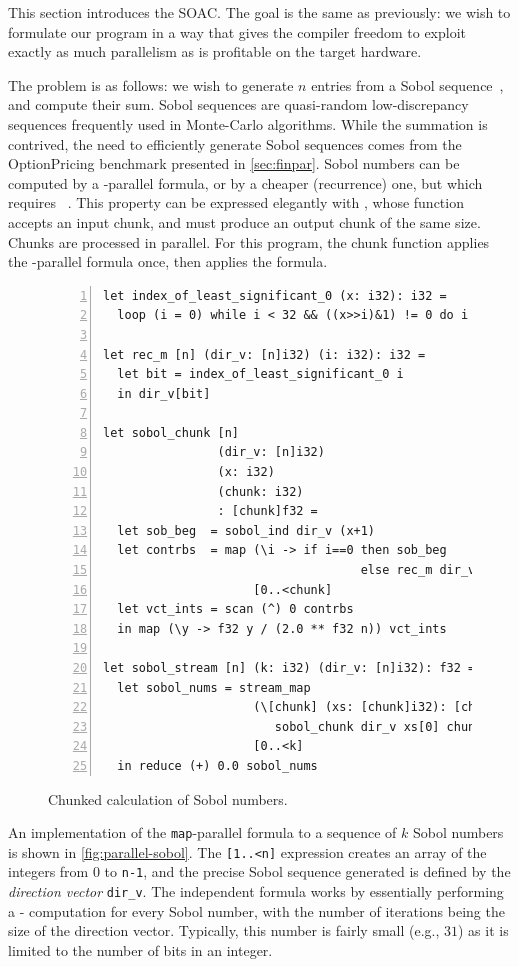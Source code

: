 This section introduces the \StreamMap{} SOAC.  The goal is the same
as previously: we wish to formulate our program in a way that gives
the compiler freedom to exploit exactly as much parallelism as is
profitable on the target hardware.

The problem is as follows: we wish to generate $n$ entries from a
Sobol sequence~\cite{Sobol}, and compute their sum.  Sobol sequences
are quasi-random low-discrepancy sequences frequently used in
Monte-Carlo algorithms.  While the summation is contrived, the need to
efficiently generate Sobol sequences comes from the OptionPricing
benchmark presented in \cref{sec:finpar}.  Sobol numbers can be
computed by a -parallel formula, or by a cheaper (recurrence)
one, but which requires ~\cite{FinPar:TACO,LexiFiPricing}.
This property can be expressed elegantly with \StreamMap{}, whose
function accepts an input chunk, and must produce an output chunk of
the same size.  Chunks are processed in parallel.  For this program,
the chunk function applies the -parallel formula once, then
applies the  formula.

\begin{figure}
\begin{lstlisting}[numbers=left]
let index_of_least_significant_0 (x: i32): i32 =
  loop (i = 0) while i < 32 && ((x>>i)&1) != 0 do i + 1

let rec_m [n] (dir_v: [n]i32) (i: i32): i32 =
  let bit = index_of_least_significant_0 i
  in dir_v[bit]

let sobol_chunk [n]
                (dir_v: [n]i32)
                (x: i32)
                (chunk: i32)
                : [chunk]f32 =
  let sob_beg  = sobol_ind dir_v (x+1)
  let contrbs  = map (\i -> if i==0 then sob_beg
                                    else rec_m dir_v (i+x))
                     [0..<chunk]
  let vct_ints = scan (^) 0 contrbs
  in map (\y -> f32 y / (2.0 ** f32 n)) vct_ints

let sobol_stream [n] (k: i32) (dir_v: [n]i32): f32 =
  let sobol_nums = stream_map
                     (\[chunk] (xs: [chunk]i32): [chunk]f32 ->
                        sobol_chunk dir_v xs[0] chunk)
                     [0..<k]
  in reduce (+) 0.0 sobol_nums
\end{lstlisting}
\caption{Chunked calculation of Sobol numbers.}
\label{fig:streamed-sobol}
\end{figure}

An implementation of the \texttt{map}-parallel formula to a sequence
of
$k$ Sobol numbers is shown in \cref{fig:parallel-sobol}.  The
\texttt{[1..<n]} expression creates an array of the integers from
$0$ to \texttt{n-1}, and the precise Sobol sequence generated is
defined by the \textit{direction vector} \texttt{dir\_v}.  The
independent formula works by essentially performing a
- computation for every Sobol number, with the
number of iterations being the size of the direction vector.
Typically, this number is fairly small (e.g., $31$) as it is limited
to the number of bits in an integer.

